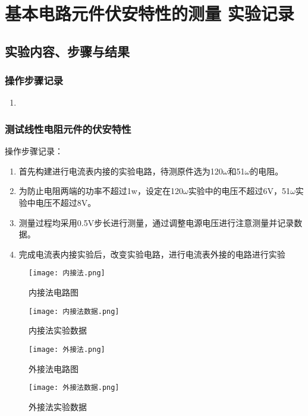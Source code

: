 \documentclass[dvipsnames, svgnames,a4paper,11pt]{article}
\begin{document}
	\section{基本电路元件伏安特性的测量 \quad\heiti 实验记录}
	
	\subsection{实验内容、步骤与结果}
	
	
	\subsubsection{操作步骤记录}
	\begin{enumerate}
		\item 
	\end{enumerate}	
	
	

	\subsubsection{测试线性电阻元件的伏安特性}
	操作步骤记录：\\
	\begin{enumerate}
		\item 首先构建进行电流表内接的实验电路，待测原件选为120$\omega$和51$\omega$的电阻。
		\item 为防止电阻两端的功率不超过1w，设定在120$\omega$实验中的电压不超过6V，51$\omega$实验中电压不超过8V。
		\item 测量过程均采用0.5V步长进行测量，通过调整电源电压进行注意测量并记录数据。
		\item 完成电流表内接实验后，改变实验电路，进行电流表外接的电路进行实验
	\end{enumerate}	
		\begin{figure}[htb]
	\centering
		\texttt{[image: 内接法.png]}
		\caption{内接法电路图}
		  
		\label{内接法电路图}
	 \end{figure}
	 \begin{figure}[htbp]
	 	\centering
	 	\texttt{[image: 内接法数据.png]}
	 	\caption{内接法实验数据}
	 	\label{内接法实验数据}
	 \end{figure}
	 
	 
	 	\begin{figure}[htbp]
	 	\centering
	 	\texttt{[image: 外接法.png]}
	 	\caption{外接法电路图}
	 	\label{外接法电路图}
	 \end{figure}
	 \begin{figure}[htbp]
	 	\centering
	 	\texttt{[image: 外接法数据.png]}
	 	\caption{外接法实验数据}
	 	\label{外接法实验数据}
	 \end{figure}
	 
\end{document}
